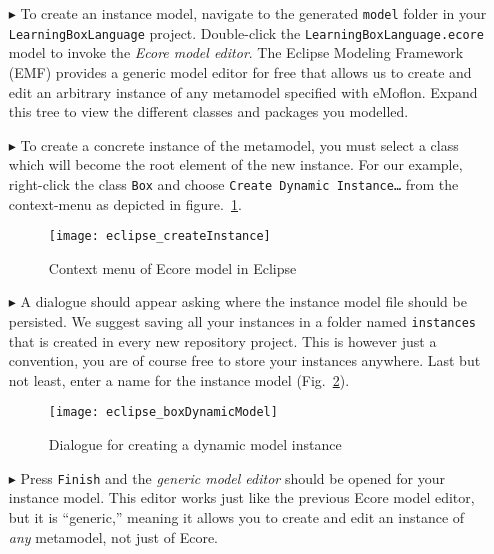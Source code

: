 \begin{itemize}

\item[$\blacktriangleright$] To create an instance model, navigate to the generated \texttt{model} folder in your \texttt{LearningBoxLanguage} project. Double-click the \texttt{LearningBoxLanguage.ecore} model to invoke  the \emph{Ecore model editor}. The Eclipse Modeling Framework (EMF) provides a generic model editor for free that allows us to create and edit an arbitrary instance of any metamodel specified with eMoflon. Expand this tree to view the different classes and packages you modelled. 

\item[$\blacktriangleright$] To create a concrete instance of the metamodel, you must select a class which will become the root element of the new instance.
For our example, right-click the class \texttt{Box} and choose \texttt{Create Dynamic Instance\ldots} from the context-menu as depicted in figure.~\ref{fig:context_menu}.

\begin{figure}[htbp]
	\centering
  \texttt{[image: eclipse\_createInstance]}
	\caption{Context menu of Ecore model in Eclipse}
	\label{fig:context_menu}
\end{figure}


\item[$\blacktriangleright$] A dialogue should appear asking where the instance model file should be persisted. We suggest saving all your instances in a folder named \texttt{instances} that is created in every new repository project. This is however just a convention, you are of course free to store your instances anywhere. Last but not least, enter a name for the instance model (Fig.~\ref{fig:store_dynamic_instance}).

\begin{figure}[htbp]
	\centering
  \texttt{[image: eclipse\_boxDynamicModel]}
	\caption{Dialogue for creating a dynamic model instance}
	\label{fig:store_dynamic_instance}
\end{figure}

\item[$\blacktriangleright$] Press \texttt{Finish} and the \emph{generic model editor} should be opened for your instance model.
This editor works just like the previous Ecore model editor, but it is ``generic,'' meaning it allows you to create and edit an instance of \emph{any} metamodel, not just of Ecore.


\end{itemize}
